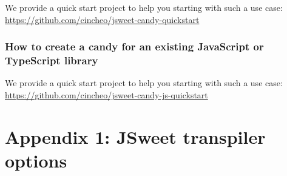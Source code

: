\documentclass[a4paper]{report}
\begin{document}
We provide a quick start project to help you starting with such a use case: \url{https://github.com/cincheo/jsweet-candy-quickstart}

\subsection{How to create a candy for an existing JavaScript or TypeScript library}

We provide a quick start project to help you starting with such a use case: \url{https://github.com/cincheo/jsweet-candy-js-quickstart}

\chapter*{Appendix 1: JSweet transpiler options}
\end{document}
